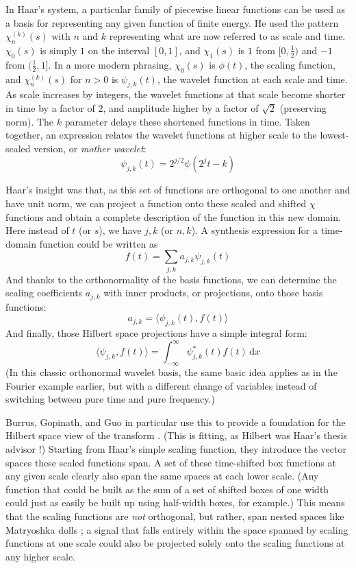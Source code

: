 \documentclass[letterpaper]{article}
\begin{document}
In Haar's system, a particular family of piecewise linear functions can be used as a basis for
representing any given function of finite energy.
He used the pattern \(\chi_n^{(k)}(s)\) with $n$ and $k$ representing what are now referred to as scale and time.
\(\chi_0(s)\) is simply $1$ on the interval $[0,1]$, and \(\chi_1(s)\) is $1$ from $[0,\tfrac{1}{2})$
and $-1$ from $(\tfrac{1}{2},1]$.
In a more modern phrasing, \(\chi_0(s)\) is \(\phi(t)\), the scaling function,
and \(\chi_n^{(k)}(s)\) for $n>0$ is \(\psi_{j,k}(t)\), the wavelet function at each scale and time.
As scale increases by integers, the wavelet functions at that scale become shorter in time by a factor of $2$,
and amplitude higher by a factor of $\sqrt{2}$ (preserving norm).
The $k$ parameter delays these shortened functions in time.
Taken together, an expression relates the wavelet functions at higher scale to the lowest-scaled version, or
\emph{mother wavelet}:
\begin{equation}
\psi_{j,k}(t) = 2^{j/2}\psi(2^jt-k)
\end{equation}

Haar's insight was that, as this set of functions are orthogonal to one another and have unit norm,
we can project a function onto these scaled and shifted $\chi$ functions and obtain a complete description of the function in this new domain.
Here instead of $t$ (or $s$), we have $j,k$ (or $n,k$).
A synthesis expression for a time-domain function could be written as
\[
f(t) = \sum_{j,k} a_{j,k}\psi_{j,k}(t)
\]
And thanks to the orthonormality of the basis functions, we can determine the scaling coefficients $a_{j,k}$ with inner products,
or projections, onto those basis functions:
\[
a_{j,k} = \langle \psi_{j,k}(t), f(t) \rangle
\]
And finally, those Hilbert space projections have a simple integral form:
\[
\langle \psi_{j,k}, f(t) \rangle = \int_{-\infty}^\infty \psi_{j,k}^*(t)f(t)\,\mathrm{d}x
\]
(In this classic orthonormal wavelet basis, the same basic idea applies as in the Fourier example earlier,
but with a different change of variables instead of switching between pure time and pure frequency.)

Burrus, Gopinath, and Guo in particular use this to provide a foundation for the Hilbert space view of the transform \cite{burrus}.
(This is fitting, as Hilbert was Haar's thesis advisor \cite{hilbert}!)
Starting from Haar's simple scaling function, they introduce the vector spaces these scaled functions span.
A set of these time-shifted box functions at any given scale clearly also span the same spaces at each lower scale.
(Any function that could be built as the sum of a set of shifted boxes of one width could just as easily be built up using half-width boxes, for example.)
This means that the scaling functions are \emph{not} orthogonal, but rather, span nested spaces like Matryoshka dolls \cite[Fig.~2.1]{burrus};
a signal that falls entirely within the space spanned by scaling functions at one scale could also be projected solely onto the scaling functions at any higher scale.
\end{document}
